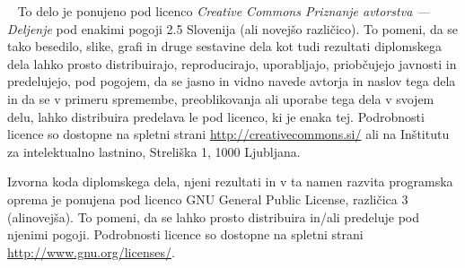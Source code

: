 \licensepage
{
    ~\vfill\noindent
    To delo je ponujeno pod licenco \emph{Creative Commons Priznanje avtorstva --- Deljenje} pod
    enakimi pogoji 2.5 Slovenija (ali novejšo različico). To pomeni, da se tako besedilo, slike,
    grafi in druge sestavine dela kot tudi rezultati diplomskega dela lahko prosto distribuirajo,
    reproducirajo, uporabljajo, priobčujejo javnosti in predelujejo, pod pogojem, da se jasno
    in vidno navede avtorja in naslov tega dela in da se v primeru spremembe, preoblikovanja
    ali uporabe tega dela v svojem delu, lahko distribuira predelava le pod licenco, ki je enaka
    tej. Podrobnosti licence so dostopne na spletni strani \url{http://creativecommons.si/} ali na
    Inštitutu za intelektualno lastnino, Streliška 1, 1000 Ljubljana.

    \begin{center}
        \Huge\ccbysa
    \end{center}

    \medskip\noindent
    Izvorna koda diplomskega dela, njeni rezultati in v ta namen razvita programska oprema je
    ponujena pod licenco GNU General Public License, različica 3 (alinovejša). To pomeni,
    da se lahko prosto distribuira in/ali predeluje pod njenimi pogoji. Podrobnosti licence so
    dostopne na spletni strani \url{http://www.gnu.org/licenses/}.
}